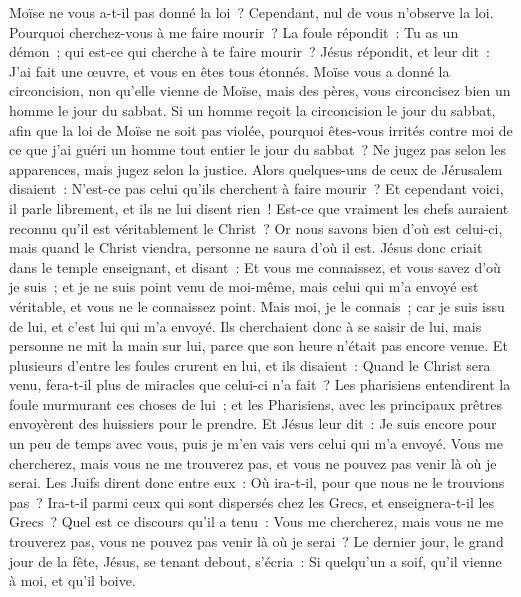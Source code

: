 \begin{multicols}{2}
Moïse ne vous a-t-il pas donné la loi~? Cependant, nul de vous n'observe la loi. Pourquoi cherchez-vous à me faire mourir~?
La foule répondit~: Tu as un démon~; qui est-ce qui cherche à te faire mourir~?
Jésus répondit, et leur dit~: J'ai fait une œuvre, et vous en êtes tous étonnés.
Moïse vous a donné la circoncision, non qu'elle vienne de Moïse, mais des pères, vous circoncisez bien un homme le jour du sabbat.
Si un homme reçoit la circoncision le jour du sabbat, afin que la loi de Moïse ne soit pas violée, pourquoi êtes-vous irrités contre moi de ce que j'ai guéri un homme tout entier le jour du sabbat~?
Ne jugez pas selon les apparences, mais jugez selon la justice.
Alors quelques-uns de ceux de Jérusalem disaient~: N'est-ce pas celui qu'ils cherchent à faire mourir~?
Et cependant voici, il parle librement, et ils ne lui disent rien~! Est-ce que vraiment les chefs auraient reconnu qu'il est véritablement le Christ~?
Or nous savons bien d'où est celui-ci, mais quand le Christ viendra, personne ne saura d'où il est.
Jésus donc criait dans le temple enseignant, et disant~: Et vous me connaissez, et vous savez d'où je suis~; et je ne suis point venu de moi-même, mais celui qui m'a envoyé est véritable, et vous ne le connaissez point. 
Mais moi, je le connais~; car je suis issu de lui, et c'est lui qui m'a envoyé.
Ils cherchaient donc à se saisir de lui, mais personne ne mit la main sur lui, parce que son heure n'était pas encore venue.
Et plusieurs d'entre les foules crurent en lui, et ils disaient~: Quand le Christ sera venu, fera-t-il plus de miracles que celui-ci n'a fait~?
Les pharisiens entendirent la foule murmurant ces choses de lui~; et les Pharisiens, avec les principaux prêtres envoyèrent des huissiers pour le prendre.
Et Jésus leur dit~: Je suis encore pour un peu de temps avec vous, puis je m'en vais vers celui qui m'a envoyé.
Vous me chercherez, mais vous ne me trouverez pas, et vous ne pouvez pas venir là où je serai.
Les Juifs dirent donc entre eux~: Où ira-t-il, pour que nous ne le trouvions pas~? Ira-t-il parmi ceux qui sont dispersés chez les Grecs, et enseignera-t-il les Grecs~?
Quel est ce discours qu'il a tenu~: Vous me chercherez, mais vous ne me trouverez pas, vous ne pouvez pas venir là où je serai~?
Le dernier jour, le grand jour de la fête, Jésus, se tenant debout, s'écria~: Si quelqu'un a soif, qu'il vienne à moi, et qu'il boive.

\end{multicols}
